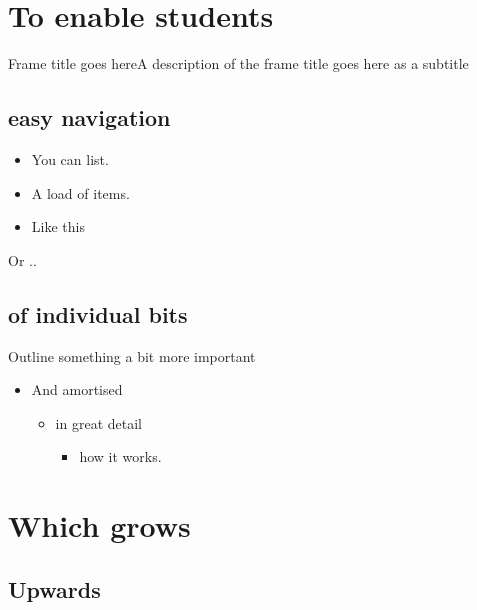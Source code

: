 \documentclass[]{beamer}
\begin{document}
\section{To enable students}
\begin{frame}[t]{Frame title goes here}{A description of the frame title goes here as a subtitle}
  \subsection{easy navigation}
  \begin{itemize}
    \item You can list.
    \item A load of items.
    \item Like this
  \end{itemize}
  Or ..
  \subsection{of individual bits}
  \begin{alertblock}{Outline something a bit more important}
    \begin{itemize}
      \item And amortised
            \begin{itemize}
              \item in great detail
                    \begin{itemize}
                      \item how it works.
                    \end{itemize}
            \end{itemize}


    \end{itemize}
  \end{alertblock}
  \section{Which grows}
  \subsection{Upwards}
\end{frame}
\end{document}

